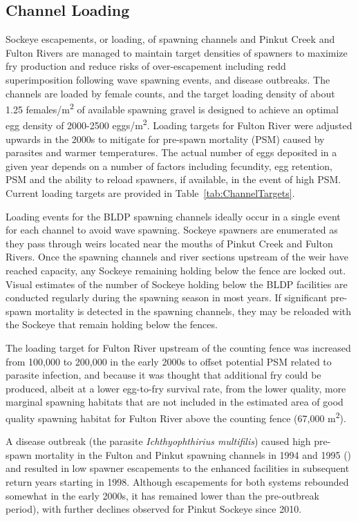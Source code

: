 \documentclass[french,11pt]{book}
\begin{document}
\endgroup{} \endgroup{}

\subsection{Channel Loading}\label{channel-loading}

Sockeye escapements, or loading, of spawning channels and Pinkut Creek and Fulton Rivers are managed to maintain target densities of spawners to maximize fry production and reduce risks of over-escapement including redd superimposition following wave spawning events, and disease outbreaks. The channels are loaded by female counts, and the target loading density of about 1.25 females/m\textsuperscript{2} of available spawning gravel is designed to achieve an optimal egg density of 2000-2500 eggs/m\textsuperscript{2}. Loading targets for Fulton River were adjusted upwards in the 2000s to mitigate for pre-spawn mortality (PSM) caused by parasites and warmer temperatures. The actual number of eggs deposited in a given year depends on a number of factors including fecundity, egg retention, PSM and the ability to reload spawners, if available, in the event of high PSM. Current loading targets are provided in Table~\ref{tab:ChannelTargets}.

Loading events for the BLDP spawning channels ideally occur in a single event for each channel to avoid wave spawning. Sockeye spawners are enumerated as they pass through weirs located near the mouths of Pinkut Creek and Fulton Rivers. Once the spawning channels and river sections upstream of the weir have reached capacity, any Sockeye remaining holding below the fence are locked out. Visual estimates of the number of Sockeye holding below the BLDP facilities are conducted regularly during the spawning season in most years. If significant pre-spawn mortality is detected in the spawning channels, they may be reloaded with the Sockeye that remain holding below the fences.

The loading target for Fulton River upstream of the counting fence was increased from 100,000 to 200,000 in the early 2000s to offset potential PSM related to parasite infection, and because it was thought that additional fry could be produced, albeit at a lower egg-to-fry survival rate, from the lower quality, more marginal spawning habitats that are not included in the estimated area of good quality spawning habitat for Fulton River above the counting fence (67,000 m\textsuperscript{2}).

A disease outbreak (the parasite \emph{Ichthyophthirius multifilis}) caused high pre-spawn mortality in the Fulton and Pinkut spawning channels in 1994 and 1995 () and resulted in low spawner escapements to the enhanced facilities in subsequent return years starting in 1998. Although escapements for both systems rebounded somewhat in the early 2000s, it has remained lower than the pre-outbreak period), with further declines observed for Pinkut Sockeye since 2010.
\end{document}
